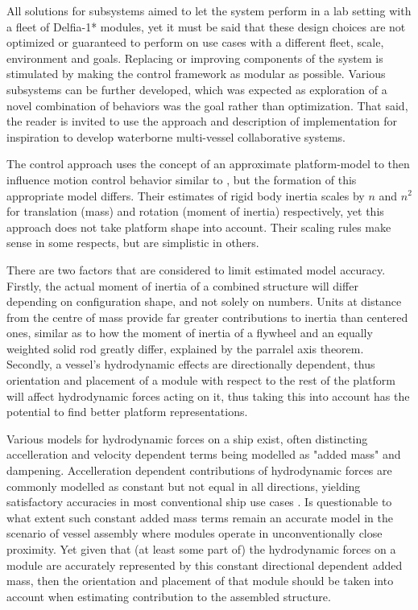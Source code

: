 All solutions for subsystems aimed to let the system perform in a lab setting with a fleet of Delfia-1* modules, yet it must be said that these design choices are not optimized or guaranteed to perform on use cases with a different fleet, scale, environment and goals. Replacing or improving components of the system is stimulated by making the control framework as modular as possible. Various subsystems can be further developed, which was expected as exploration of a novel combination of behaviors was the goal rather than optimization. That said, the reader is invited to use the approach and description of implementation for inspiration to develop waterborne multi-vessel collaborative systems.


The control approach uses the concept of an approximate platform-model to then influence motion control behavior similar to \citet{park2019coordinated}, but the formation of this appropriate model differs. Their estimates of rigid body inertia scales by $n$ and $n^2$ for translation (mass) and rotation (moment of inertia) respectively, yet this approach does not take platform shape into account. Their scaling rules make sense in some respects, but are simplistic in others. %

There are two factors that are considered to limit estimated model accuracy. Firstly, the actual moment of inertia of a combined structure will differ depending on configuration shape, and not solely on numbers. Units at distance from the centre of mass provide far greater contributions to inertia than centered ones, similar as to how the moment of inertia of a flywheel and an equally weighted solid rod greatly differ, explained by the parralel axis theorem.
Secondly, a vessel's hydrodynamic effects are directionally dependent, thus orientation and placement of a module with respect to the rest of the platform will affect hydrodynamic forces acting on it, thus taking this into account has the potential to find better platform representations. 

Various models for hydrodynamic forces on a ship exist, often distincting accelleration and velocity dependent terms being modelled as "added mass" and dampening. Accelleration dependent contributions of hydrodynamic forces are commonly modelled as constant but not  equal in all directions, yielding satisfactory accuracies in most conventional ship use cases \citet{humphreys1978prediction}. Is questionable to what extent such constant added mass terms remain an accurate model in the scenario of vessel assembly where modules operate in unconventionally close proximity. Yet given that (at least some part of) the hydrodynamic forces on a module are accurately represented by this constant directional dependent added mass, then the orientation and placement of that module should be taken into account when estimating contribution to the assembled structure. 


